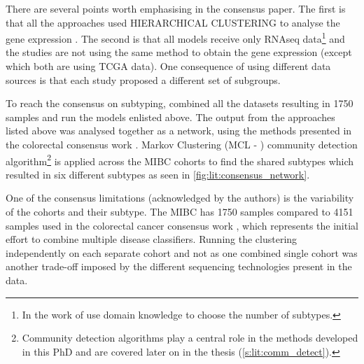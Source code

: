 There are several points worth emphasising in the consensus paper. The first is that all the approaches used \gls{HIERARCHICAL CLUSTERING} to analyse the gene expression \citep{Mo2018-rl, Damrauer2014-tc, Choi2014-ed, Marzouka2018-ge, Rebouissou2014-ep,Robertson2017-mg}. The second is that all models receive only RNAseq data\footnote{In the work of \citeauthor{Robertson2017-mg} use domain knowledge to choose the number of subtypes.} and the studies are not using the same method to obtain the gene expression (except \citet{Robertson2017-mg, Mo2018-rl} which both are using TCGA data). One consequence of using different data sources is that each study proposed a different set of subgroups. 

To reach the consensus on subtyping, \citeauthor{Kamoun2020-tj} combined all the datasets resulting in 1750 samples and run the models enlisted above. The output from the approaches listed above was analysed together as a network, using the methods presented in the colorectal consensus work \citep{Guinney2015-fy}. Markov Clustering (MCL - \citet{Van_Dongen2008-yj}) community detection algorithm\footnote{Community detection algorithms play a central role in the methods developed in this PhD and are covered later on in the thesis (\cref{s:lit:comm_detect}).} is applied  across the MIBC cohorts to find the shared subtypes which resulted in six different subtypes as seen in \cref{fig:lit:consensus_network}. 


One of the consensus limitations (acknowledged by the authors) is the variability of the cohorts and their subtype. The MIBC has 1750 samples compared to 4151 samples used in the colorectal cancer consensus work \citep{Guinney2015-fy}, which represents the initial effort to combine multiple disease classifiers. Running the clustering independently on each separate cohort and not as one combined single cohort was another trade-off imposed by the different sequencing technologies present in the data. 

